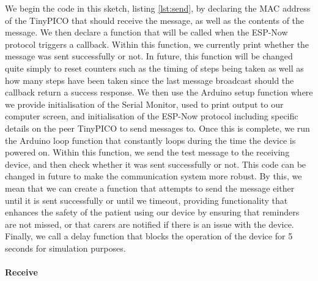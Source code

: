 \documentclass[12pt, a4paper]{report}
\begin{document}
{We begin the code in this sketch, listing \ref{lst:send}, by declaring the MAC address of the TinyPICO that should receive the message, as well as the contents of the message. We then declare a function that will be called when the ESP-Now protocol triggers a callback. Within this function, we currently print whether the message was sent successfully or not. In future, this function will be changed quite simply to reset counters such as the timing of steps being taken as well as how many steps have been taken since the last message broadcast should the callback return a success response. We then use the Arduino setup function where we provide initialisation of the Serial Monitor, used to print output to our computer screen, and initialisation of the ESP-Now protocol including specific details on the peer TinyPICO to send messages to. Once this is complete, we run the Arduino loop function that constantly loops during the time the device is powered on. Within this function, we send the test message to the receiving device, and then check whether it was sent successfully or not. This code can be changed in future to make the communication system more robust. By this, we mean that we can create a function that attempts to send the message either until it is sent successfully or until we timeout, providing functionality that enhances the safety of the patient using our device by ensuring that reminders are not missed, or that carers are notified if there is an issue with the device. Finally, we call a delay function that blocks the operation of the device for 5 seconds for simulation purposes.

\paragraph{Receive}



}
\end{document}
